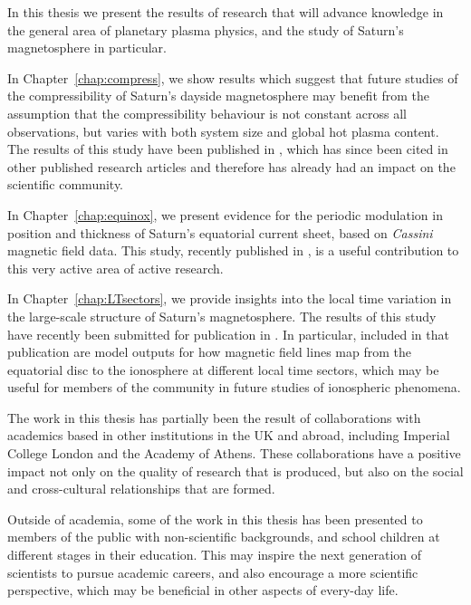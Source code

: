 \begin{impactstatement} %
In this thesis we present the results of research that will advance knowledge in the general area of planetary plasma physics, and the study of Saturn's magnetosphere in particular. 

In Chapter~\ref{chap:compress}, we show results which suggest that future studies of the compressibility of Saturn's dayside magnetosphere may benefit from the assumption that the compressibility behaviour is not constant across all observations, but varies with both system size and global hot plasma content. The results of this study have been published in \citet{sorba2017}, which has since been cited in other published research articles and therefore has already had an impact on the scientific community. 

In Chapter~\ref{chap:equinox}, we present evidence for the periodic modulation in position and thickness of Saturn's equatorial current sheet, based on \textit{Cassini} magnetic field data. This study, recently published in \citet{sorba2018}, is a useful contribution to this very active area of active research.

In Chapter~\ref{chap:LTsectors}, we provide insights into the local time variation in the large-scale structure of Saturn's magnetosphere. 
The results of this study have recently been submitted for publication in \citet{sorba2019}. In particular, included in that publication are model outputs for how magnetic field lines map from the equatorial disc to the ionosphere at different local time sectors, which may be useful for members of the community in future studies of ionospheric phenomena.

The work in this thesis has partially been the result of collaborations with academics based in other institutions in the UK and abroad, including Imperial College London and the Academy of Athens. These collaborations have a positive impact not only on the quality of research that is produced, but also on the social and cross-cultural relationships that are formed.

Outside of academia, some of the work in this thesis has been presented to members of the public with non-scientific backgrounds, and school children at different stages in their education. This may inspire the next generation of scientists to pursue academic careers, and also encourage a more scientific perspective, which may be beneficial in other aspects of every-day life.


\end{impactstatement}
